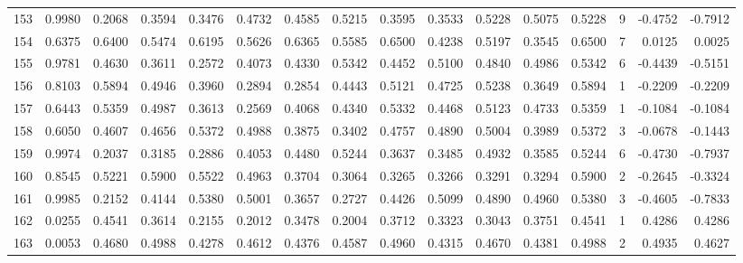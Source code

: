 \begin{tabular}{lrrrrrrrrrrrrrrr}
153 &      0.9980 &  0.2068 &  0.3594 &  0.3476 &  0.4732 &  0.4585 &  0.5215 &  0.3595 &  0.3533 &  0.5228 &   0.5075 &     0.5228 &      9 &                   -0.4752 &                    -0.7912 \\
154 &      0.6375 &  0.6400 &  0.5474 &  0.6195 &  0.5626 &  0.6365 &  0.5585 &  0.6500 &  0.4238 &  0.5197 &   0.3545 &     0.6500 &      7 &                    0.0125 &                     0.0025 \\
155 &      0.9781 &  0.4630 &  0.3611 &  0.2572 &  0.4073 &  0.4330 &  0.5342 &  0.4452 &  0.5100 &  0.4840 &   0.4986 &     0.5342 &      6 &                   -0.4439 &                    -0.5151 \\
156 &      0.8103 &  0.5894 &  0.4946 &  0.3960 &  0.2894 &  0.2854 &  0.4443 &  0.5121 &  0.4725 &  0.5238 &   0.3649 &     0.5894 &      1 &                   -0.2209 &                    -0.2209 \\
157 &      0.6443 &  0.5359 &  0.4987 &  0.3613 &  0.2569 &  0.4068 &  0.4340 &  0.5332 &  0.4468 &  0.5123 &   0.4733 &     0.5359 &      1 &                   -0.1084 &                    -0.1084 \\
158 &      0.6050 &  0.4607 &  0.4656 &  0.5372 &  0.4988 &  0.3875 &  0.3402 &  0.4757 &  0.4890 &  0.5004 &   0.3989 &     0.5372 &      3 &                   -0.0678 &                    -0.1443 \\
159 &      0.9974 &  0.2037 &  0.3185 &  0.2886 &  0.4053 &  0.4480 &  0.5244 &  0.3637 &  0.3485 &  0.4932 &   0.3585 &     0.5244 &      6 &                   -0.4730 &                    -0.7937 \\
160 &      0.8545 &  0.5221 &  0.5900 &  0.5522 &  0.4963 &  0.3704 &  0.3064 &  0.3265 &  0.3266 &  0.3291 &   0.3294 &     0.5900 &      2 &                   -0.2645 &                    -0.3324 \\
161 &      0.9985 &  0.2152 &  0.4144 &  0.5380 &  0.5001 &  0.3657 &  0.2727 &  0.4426 &  0.5099 &  0.4890 &   0.4960 &     0.5380 &      3 &                   -0.4605 &                    -0.7833 \\
162 &      0.0255 &  0.4541 &  0.3614 &  0.2155 &  0.2012 &  0.3478 &  0.2004 &  0.3712 &  0.3323 &  0.3043 &   0.3751 &     0.4541 &      1 &                    0.4286 &                     0.4286 \\
163 &      0.0053 &  0.4680 &  0.4988 &  0.4278 &  0.4612 &  0.4376 &  0.4587 &  0.4960 &  0.4315 &  0.4670 &   0.4381 &     0.4988 &      2 &                    0.4935 &                     0.4627 \\

\end{tabular}
